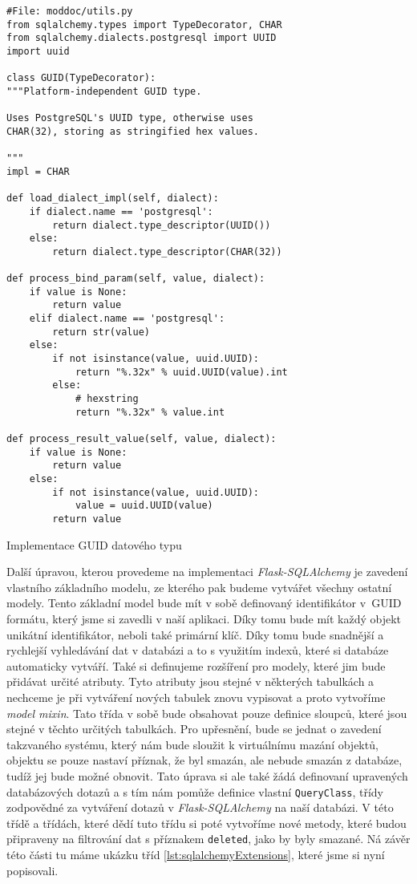 \begin{listing}[H]
    \begin{verbatim}
#File: moddoc/utils.py
from sqlalchemy.types import TypeDecorator, CHAR
from sqlalchemy.dialects.postgresql import UUID
import uuid

class GUID(TypeDecorator):
"""Platform-independent GUID type.

Uses PostgreSQL's UUID type, otherwise uses
CHAR(32), storing as stringified hex values.

"""
impl = CHAR

def load_dialect_impl(self, dialect):
    if dialect.name == 'postgresql':
        return dialect.type_descriptor(UUID())
    else:
        return dialect.type_descriptor(CHAR(32))

def process_bind_param(self, value, dialect):
    if value is None:
        return value
    elif dialect.name == 'postgresql':
        return str(value)
    else:
        if not isinstance(value, uuid.UUID):
            return "%.32x" % uuid.UUID(value).int
        else:
            # hexstring
            return "%.32x" % value.int

def process_result_value(self, value, dialect):
    if value is None:
        return value
    else:
        if not isinstance(value, uuid.UUID):
            value = uuid.UUID(value)
        return value
    \end{verbatim}
    \caption{Implementace GUID datového typu}
    \label{lst:guidImplementation}
\end{listing}

\clearpage

Další úpravou, kterou provedeme na implementaci
\textit{Flask-SQLAlchemy} je zavedení vlastního základního modelu, ze kterého pak budeme vytvářet všechny ostatní modely. Tento základní model bude mít
v sobě definovaný identifikátor v~GUID formátu, který jsme si zavedli v naší aplikaci. Díky tomu bude mít každý objekt unikátní identifikátor, neboli také primární
klíč. Díky tomu bude snadnější a rychlejší vyhledávání dat v databázi a to s využitím indexů, které si databáze automaticky vytváří. Také si definujeme
rozšíření pro modely, které jim bude přidávat určité atributy. Tyto atributy jsou stejné v některých tabulkách a nechceme je při vytváření nových tabulek znovu
vypisovat a proto vytvoříme \textit{model mixin}. Tato třída v sobě bude obsahovat pouze definice sloupců, které jsou stejné v těchto určitých tabulkách. Pro upřesnění,
bude se jednat o zavedení takzvaného  systému, který nám bude sloužit k virtuálnímu mazání objektů, objektu se pouze nastaví příznak, že byl smazán, ale nebude
smazán z databáze, tudíž jej bude možné obnovit. Tato úprava si ale také žádá definovaní upravených databázových dotazů a s tím nám pomůže definice vlastní
\texttt{QueryClass}, třídy zodpovědné za vytváření dotazů v \textit{Flask-SQLAlchemy} na naší databázi. V této třídě a třídách, které dědí tuto třídu
si poté vytvoříme nové metody, které budou připraveny na filtrování dat s příznakem \texttt{deleted}, jako by byly smazané. Ná závěr této části tu máme
ukázku tříd \ref{lst:sqlalchemyExtensions}, které jsme si nyní popisovali.

